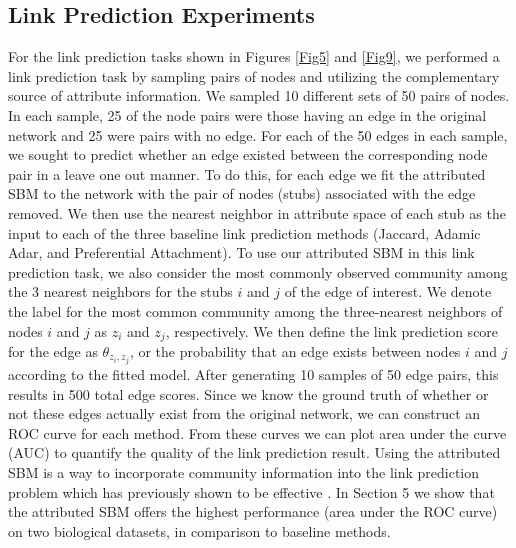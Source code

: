 \subsection{Link Prediction Experiments}
For the link prediction tasks shown in Figures \ref{Fig5} and \ref{Fig9}, we performed a link prediction task by sampling pairs of nodes and utilizing the complementary source of attribute information. We sampled 10 different sets of 50 pairs of nodes. In each sample, 25 of the node pairs were those having an edge in the original network and 25 were pairs with no edge. For each of the 50 edges in each sample, we sought to predict whether an edge existed between the corresponding node pair in a leave one out manner. To do this, for each edge we fit the attributed SBM to the network with the pair of nodes (stubs) associated with the edge removed. We then use the nearest neighbor in attribute space of each stub as the input to each of the three baseline link prediction methods (Jaccard, Adamic Adar, and Preferential Attachment). To use our attributed SBM in this link prediction task, we also consider the most commonly observed community among the 3 nearest neighbors for the stubs $i$ and $j$ of the edge of interest. We denote the label for the most common community among the three-nearest neighbors of nodes $i$ and $j$ as $z_{i}$ and $z_{j}$, respectively. We then define the link prediction score for the edge as $\theta_{z_{i},z_{j}}$, or the probability that an edge exists between nodes $i$ and $j$ according to the fitted model. After generating 10 samples of 50 edge pairs, this results in 500 total edge scores. Since we know the ground truth of whether or not these edges actually exist from the original network, we can construct an ROC curve for each method. From these curves we can plot area under the curve (AUC) to quantify the quality of the link prediction result. Using the attributed SBM is a way to incorporate community information into the link prediction problem which has previously shown to be effective \cite{linkComm}. In Section 5 we show that the attributed SBM offers the highest performance (area under the ROC curve) on two biological datasets, in comparison to baseline methods. 
